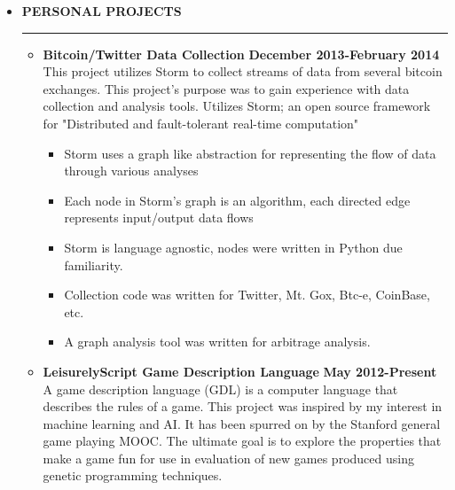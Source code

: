 \documentclass[overlapped]{res}
\begin{document}
\begin{resume}
\begin{itemize}[leftmargin=0in]
    \item[] \textbf{PERSONAL PROJECTS} \\[-0.1in] \rule{\textwidth}{0.5pt}
        \begin{itemize}[leftmargin=0in]
            \item[] 
                \begin{samepage}
                    \textbf{Bitcoin/Twitter Data Collection} \hfill \textbf{December 2013-February 2014} \\
                    This project utilizes Storm to collect streams of data from several bitcoin exchanges. This 
                    project's purpose was to gain experience with data collection and analysis tools. Utilizes 
                    Storm; an open source framework for "Distributed and fault-tolerant real-time computation"
                    \begin{itemize}
                        \item[\textbullet] Storm uses a graph like abstraction for representing the flow of data through various analyses
                        \item[\textbullet] Each node in Storm's graph is an algorithm, each directed edge represents input/output data flows
                        \item[\textbullet] Storm is language agnostic, nodes were written in Python due familiarity.
                        \item[\textbullet] Collection code was written for Twitter, Mt. Gox, Btc-e, CoinBase, etc.
                        \item[\textbullet] A graph analysis tool was written for arbitrage analysis.
                    \end{itemize}
                \end{samepage}
            \item[] 
                \begin{samepage}
                    \textbf{LeisurelyScript Game Description Language} \hfill \textbf{May 2012-Present} \\
                    A game description language (GDL) is a computer language that describes the rules of a game. 
                    This project was inspired by my interest in machine learning and AI. It has been spurred on by the 
                    Stanford general game playing MOOC. The ultimate goal is to explore the properties that make a game
                    fun for use in evaluation of new games produced using genetic programming techniques. 

\end{samepage}
\end{itemize}
\end{itemize}
\end{resume}
\end{document}
